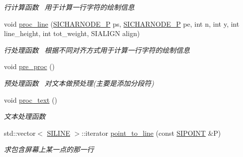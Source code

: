 \begin{DoxyCompactItemize}
\begin{DoxyCompactList}\small\item\em 行计算函数~\newline
用于计算一行字符的绘制信息 \end{DoxyCompactList}\item 
void \hyperlink{class_s_i_t_e_x_t_af58415e4e32c7c9c35f5e92a2127e77c}{proc\+\_\+line} (\hyperlink{class_s_i_c_h_a_r_n_o_d_e}{S\+I\+C\+H\+A\+R\+N\+O\+D\+E\+\_\+P} ps, \hyperlink{class_s_i_c_h_a_r_n_o_d_e}{S\+I\+C\+H\+A\+R\+N\+O\+D\+E\+\_\+P} pe, int n, int y, int line\+\_\+height, int tot\+\_\+weight, S\+I\+A\+L\+I\+GN align)
\begin{DoxyCompactList}\small\item\em 行处理函数~\newline
根据不同对齐方式用于计算一行字符的绘制信息 \end{DoxyCompactList}\item 
\mbox{\label{class_s_i_t_e_x_t_a726b8b5395734daac1028781e77892ad}} 
void \hyperlink{class_s_i_t_e_x_t_a726b8b5395734daac1028781e77892ad}{pre\+\_\+proc} ()
\begin{DoxyCompactList}\small\item\em 预处理函数~\newline
对文本做预处理(主要是添加分段符) \end{DoxyCompactList}\item 
\mbox{\label{class_s_i_t_e_x_t_af683b8ad0f40b7e182986d9bb39558a4}} 
void \hyperlink{class_s_i_t_e_x_t_af683b8ad0f40b7e182986d9bb39558a4}{proc\+\_\+text} ()
\begin{DoxyCompactList}\small\item\em 文本处理函数 \end{DoxyCompactList}\item 
\mbox{\label{class_s_i_t_e_x_t_afe20f1a6f5380d4d6cb005e872980289}} 
std\+::vector$<$ \hyperlink{struct_s_i_r_a_n_g_e}{S\+I\+L\+I\+NE} $>$\+::iterator \hyperlink{class_s_i_t_e_x_t_afe20f1a6f5380d4d6cb005e872980289}{point\+\_\+to\+\_\+line} (const \hyperlink{struct_s_i_p_o_i_n_t}{S\+I\+P\+O\+I\+NT} \&P)
\begin{DoxyCompactList}\small\item\em 求包含屏幕上某一点的那一行 \end{DoxyCompactList}\item 
\mbox{\label{class_s_i_t_e_x_t_ac0de66d8174d426e6b90641f36c6f74c}} 

\end{DoxyCompactItemize}
